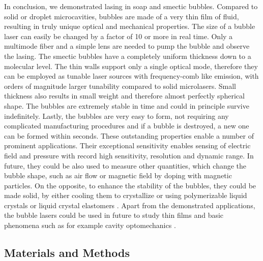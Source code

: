 \documentclass[a4paper,12pt]{article}
\begin{document}
	In conclusion, we demonstrated lasing in soap and smectic bubbles. Compared to solid or droplet microcavities, bubbles are made of a very thin film of fluid, resulting in truly unique optical and mechanical properties. The size of a bubble laser can easily be changed by a factor of 10 or more in real time. Only a multimode fiber and a simple lens are needed to pump the bubble and observe the lasing. The smectic bubbles have a completely uniform thickness down to a molecular level. The thin walls support only a single optical mode, therefore they can be employed as tunable laser sources with frequency-comb like emission, with orders of magnitude larger tunability compared to solid microlasers. Small thickness also results in small weight and therefore almost perfectly spherical shape. The bubbles are extremely stable in time and could in principle survive indefinitely. Lastly, the bubbles are very easy to form, not requiring any complicated manufacturing procedures and if a bubble is destroyed, a new one can be formed within seconds. These outstanding properties enable a number of prominent applications. Their exceptional sensitivity enables sensing of electric field and pressure with record high sensitivity, resolution and dynamic range. In future, they could be also used to measure other quantities, which change the bubble shape, such as air flow or magnetic field by doping with magnetic particles. On the opposite, to enhance the stability of the bubbles, they could be made solid, by either cooling them to crystallize or using polymerizable liquid crystals or liquid crystal elastomers \cite{jampani2019liquid}. Apart from the demonstrated applications, the bubble lasers could be used in future to study thin films and basic phenomena such as for example cavity optomechanics \cite{aspelmeyer2014cavity,kim2013cavity,asano2016observation}.
	
	
	\subsection*{Materials and Methods}
	
\end{document}
